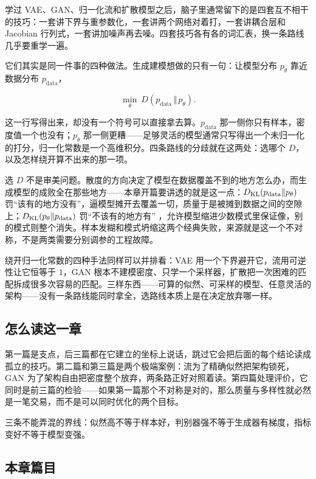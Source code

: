 学过 VAE、GAN、归一化流和扩散模型之后，脑子里通常留下的是四套互不相干的技巧：一套讲下界与重参数化，一套讲两个网络对着打，一套讲耦合层和 Jacobian 行列式，一套讲加噪声再去噪。四套技巧各有各的词汇表，换一条路线几乎要重学一遍。

它们其实是同一件事的四种做法。生成建模想做的只有一句：让模型分布 \(p_\theta\) 靠近数据分布 \(p_{\text{data}}\)，

\[
\min_\theta\ D(p_{\text{data}}\,\Vert\,p_\theta).
\]

这一行写得出来，却没有一个符号可以直接拿去算。\(p_{\text{data}}\) 那一侧你只有样本，密度值一个也没有；\(p_\theta\) 那一侧更糟——足够灵活的模型通常只写得出一个未归一化的打分，归一化常数是一个高维积分。四条路线的分歧就在这两处：选哪个 \(D\)，以及怎样绕开算不出来的那一项。

选 \(D\) 不是审美问题。散度的方向决定了模型在数据覆盖不到的地方怎么办，而生成模型的成败全在那些地方——本章开篇要讲透的就是这一点：\(D_{\mathrm{KL}}(p_{\text{data}}\Vert p_\theta)\) 罚``该有的地方没有''，逼模型摊开去覆盖一切，质量于是被摊到数据之间的空隙上；\(D_{\mathrm{KL}}(p_\theta\Vert p_{\text{data}})\) 罚``不该有的地方有'' ，允许模型缩进少数模式里保证像，别的模式则整个消失。样本发糊和模式坍缩这两个经典失败，来源就是这一个不对称，不是两类需要分别调参的工程故障。

绕开归一化常数的四种手法同样可以并排看：VAE 用一个下界避开它，流用可逆性让它恒等于 \(1\)，GAN 根本不建模密度、只学一个采样器，扩散把一次困难的匹配拆成很多次容易的匹配。三样东西——可算的似然、可采样的模型、任意灵活的架构——没有一条路线能同时拿全，选路线本质上是在决定放弃哪一样。

\subsection{怎么读这一章}

第一篇是支点，后三篇都在它建立的坐标上说话，跳过它会把后面的每个结论读成孤立的技巧。第二篇和第三篇是两个极端案例：流为了精确似然把架构锁死，GAN 为了架构自由把密度整个放弃，两条路正好对照着读。第四篇处理评价，它同时是前三篇的检验——如果第一篇那个不对称是对的，那么质量与多样性就必然是一笔交易，而不是可以同时优化的两个目标。

三条不能弄混的界线：似然高不等于样本好，判别器强不等于生成器有梯度，指标变好不等于模型变强。

\subsection{本章篇目}

